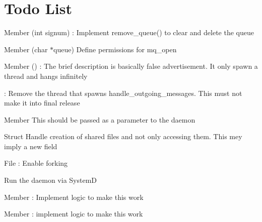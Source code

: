 \chapter{Todo List}
\hypertarget{todo}{}\label{todo}

\begin{DoxyRefList}
\item[Member \doxylink{tcfs__daemon_8c_a93d1097e4dd3c0735da3da2e89410090}{handle\+\_\+termination} (int signum)]\label{todo__todo000010}%
%
\+: Implement remove\+\_\+queue() to clear and delete the queue  
\item[Member \doxylink{queue_8c_a6997b2cacf3d2e49bc848d0274e24b13}{init\+\_\+queue} (char \texorpdfstring{$\ast$}{*}queue)]\label{todo__todo000004}%
%
Define permissions for mq\+\_\+open  
\item[Member \doxylink{tcfs__daemon_8c_ae66f6b31b5ad750f1fe042a706a4e3d4}{main} ()]\label{todo__todo000011}%
%
\+: The brief description is basically false advertisement. It only spawn a thread and hangs infinitely 



\+: Remove the thread that spawns handle\+\_\+outgoing\+\_\+messages. This must not make it into final release  
\item[Member \doxylink{redis_8c_a614217d263be1fb1a5f76e2ff7be19a2}{PORT} ]\label{todo__todo000003}%
%
This should be passed as a parameter to the daemon  
\item[Struct \doxylink{structqm__shared}{qm\+\_\+shared} ]\label{todo__todo000001}%
%
Handle creation of shared files and not only accessing them. This mey imply a new field  
\item[File \doxylink{tcfs__daemon_8c}{tcfs\+\_\+daemon.c} ]\label{todo__todo000007}%
%
\+: Enable forking 



Run the daemon via SystemD  
\item[Member \doxylink{tcfs__daemon_8c_a679ec79d065ad812032851f6872caee6}{terminate} ]\label{todo__todo000008}%
%
\+: Implement logic to make this work  
\item[Member \doxylink{tcfs__daemon_8c_af7e1db76e3a69a4b0484910b1f7562da}{terminate\+\_\+mutex} ]\label{todo__todo000009}%
%
\+: implement logic to make this work 
\end{DoxyRefList}
